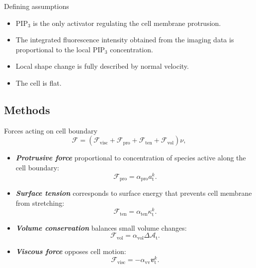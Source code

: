 \documentclass[mathserif,11pt]{beamer}
\DeclareMathOperator{\td}{\mathrm{t}}
\begin{document}
\begin{frame}{Defining assumptions}
\begin{itemize}
	\item PIP$_3$ is the only activator regulating the cell membrane protrusion.
	\item The integrated 
fluorescence intensity obtained from the imaging data is proportional to the local PIP$_3$ concentration.
	\item Local shape change is fully described by normal velocity.
	\item The cell is flat.
\end{itemize}
\end{frame}
\subsection{Methods}
\begin{frame}{Forces acting on cell boundary}
\vspace{-0.5cm}
\begin{equation*}
\mathcal{F} = (\mathcal{F}_{\textrm{visc}} + \mathcal{F}_{\textrm{pro}} + \mathcal{F}_{\textrm{ten}} + \mathcal{F}_{\textrm{vol}})\nu,
\end{equation*}
\begin{itemize}
	\item \textbf{\textit{Protrusive force}} proportional to concentration of species active along the cell boundary: \begin{equation*}
	\mathcal{F}_{\textrm{pro}} = \alpha_{\textrm{pro}}a_{\td}^{k}.
	\end{equation*}
	\item \textbf{\textit{Surface tension}} corresponds to surface energy that prevents cell membrane from stretching:
	\begin{equation*}
	\mathcal{F}_{\textrm{ten}} = \alpha_{\textrm{ten}} \kappa_{\td}^{k}.
	\end{equation*} 
	\item \textbf{\textit{Volume conservation}} balances small volume changes:
	\begin{equation*}
	\mathcal{F}_{\textrm{vol}} = \alpha_{\textrm{vol}}\Delta\mathcal{A}_{\td}.
	\end{equation*} 
	\item \textbf{\textit{Viscous force}} opposes cell motion:
	\begin{equation*}
	\mathcal{F}_{\textrm{visc}} = -\alpha_{\textrm{vv}}\mathbfit{v}_{\td}^{k}.
	\end{equation*}
\end{itemize}
$\quad$\\
$\quad$
\end{frame}
\end{document}
